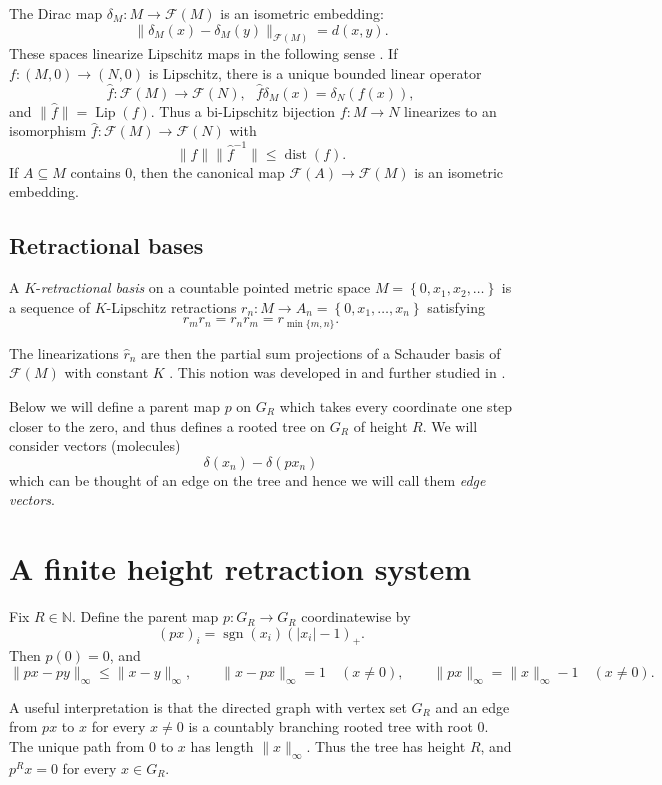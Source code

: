 \documentclass[11pt]{amsart}
\theoremstyle{definition}
\newcommand{\F}{\mathcal F}
\newcommand{\Lip}{\operatorname{Lip}}
\newcommand{\dist}{\operatorname{dist}}
\newcommand{\sgn}{\operatorname{sgn}}
\newcommand{\norm}[1]{\lVert#1\rVert}
\newcommand{\set}[1]{\left\{#1\right\}}
\def\N{{\mathbb N}}
\begin{document}
The Dirac map $\delta_M: M\to \F(M)$ is an isometric embedding:
$$
       \norm{\delta_M(x)-\delta_M(y)}_{\F(M)}=d(x,y).
$$
These spaces linearize Lipschitz maps in the following sense \cite{GK}. If $f:(M,0)\to (N,0)$ is Lipschitz, there is a unique bounded linear operator
$$
\widehat f:\F(M)\to \F(N),\ \ \ \widehat f \delta_M(x)=\delta_N(f(x)),
$$
and $\|\widehat f\|=\Lip(f)$. Thus a bi-Lipschitz bijection $f:M\to N$ linearizes to an isomorphism $\widehat f:\F(M)\to \F(N)$ with 
$$
\norm{\widehat f}\norm{\widehat f^{-1}}\le \dist(f).
$$
If $A\subseteq M$ contains 0, then the canonical map $\F(A)\to \F(M)$ is an isometric embedding.

\subsection{Retractional bases}
A $K$-{\em retractional basis} on a countable pointed metric space $M=\set{0, x_1, x_2, \ldots}$ is a sequence of $K$-Lipschitz retractions $r_n:M\to A_n=\set{0, x_1,\ldots, x_n}$ satisfying
$$
r_mr_n=r_nr_m=r_{\min\{m,n\}}.
$$

The linearizations $\widehat r_n$ are then the partial sum projections of a Schauder basis of $\F(M)$ with constant $K$ \cite[Theorem 13]{HN}. This notion was developed in \cite{HN} and further studied in \cite{HM}.

Below we will define a parent map $p$ on $G_R$ which takes every coordinate one step closer to the zero, and thus defines a rooted tree on $G_R$ of height $R$. We will consider vectors (molecules)
$$
\delta(x_n)-\delta(px_n)
$$
which can be thought of an edge on the tree and hence we will call them {\em edge vectors}.

\section{A finite height retraction system}

Fix $R\in\N$. Define the parent map $p:G_R\to G_R$ coordinatewise by
$$
(px)_i=\sgn(x_i)(|x_i|-1)_+.
$$
Then $p(0)=0$, and
\begin{equation}\label{eq:parent-properties}
 \norm{px-py}_\infty\leq\norm{x-y}_\infty,
 \qquad
 \norm{x-px}_\infty=1\quad(x\neq0),
 \qquad
 \norm{px}_\infty=\norm{x}_\infty-1\quad(x\neq0).
\end{equation}

A useful interpretation is that the directed graph with vertex set $G_R$ and an edge from $px$ to $x$ for
every $x\neq0$ is a countably branching rooted tree with root $0$.  The unique
path from $0$ to $x$ has length $\norm{x}_\infty$.  Thus the tree has height
$R$, and $p^R x=0$ for every $x\in G_R$.
\end{document}
